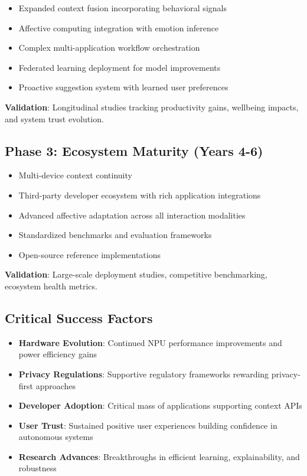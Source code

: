 \documentclass[conference]{IEEEtran}
\begin{document}
\begin{itemize}
\item Expanded context fusion incorporating behavioral signals
\item Affective computing integration with emotion inference
\item Complex multi-application workflow orchestration
\item Federated learning deployment for model improvements
\item Proactive suggestion system with learned user preferences
\end{itemize}

\textbf{Validation}: Longitudinal studies tracking productivity gains, wellbeing impacts, and system trust evolution.

\subsection{Phase 3: Ecosystem Maturity (Years 4-6)}

\begin{itemize}
\item Multi-device context continuity
\item Third-party developer ecosystem with rich application integrations
\item Advanced affective adaptation across all interaction modalities
\item Standardized benchmarks and evaluation frameworks
\item Open-source reference implementations
\end{itemize}

\textbf{Validation}: Large-scale deployment studies, competitive benchmarking, ecosystem health metrics.

\subsection{Critical Success Factors}

\begin{itemize}
\item \textbf{Hardware Evolution}: Continued NPU performance improvements and power efficiency gains
\item \textbf{Privacy Regulations}: Supportive regulatory frameworks rewarding privacy-first approaches
\item \textbf{Developer Adoption}: Critical mass of applications supporting context APIs
\item \textbf{User Trust}: Sustained positive user experiences building confidence in autonomous systems
\item \textbf{Research Advances}: Breakthroughs in efficient learning, explainability, and robustness
\end{itemize}
\end{document}
